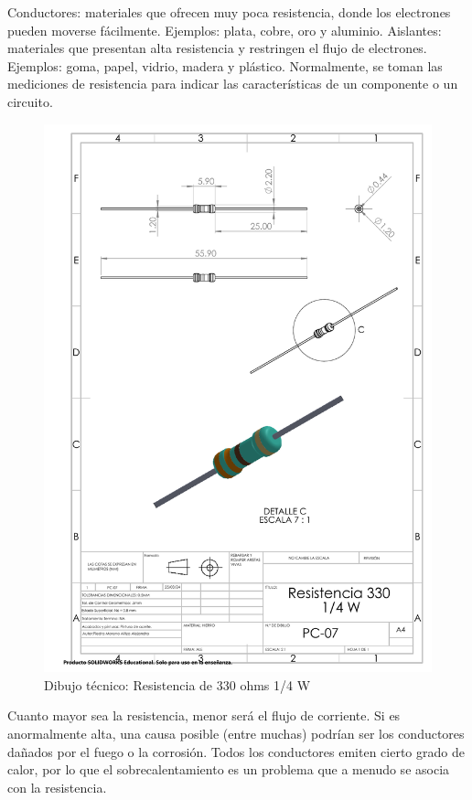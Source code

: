     Conductores: materiales que ofrecen muy poca resistencia, donde los electrones pueden moverse fácilmente. Ejemplos: plata, cobre, oro y aluminio.
    Aislantes: materiales que presentan alta resistencia y restringen el flujo de electrones. Ejemplos: goma, papel, vidrio, madera y plástico.
    Normalmente, se toman las mediciones de resistencia para indicar las características de un componente o un circuito.
    \begin{figure}[H]
        \centering
        \includegraphics[trim = {22mm 210mm 20mm 20mm},clip,scale=0.4]{22/Img/resistenciaDibujo.PDF}
        \caption{Dibujo técnico: Resistencia de 330 ohms 1/4 W}
        \label{fig:resistencia}
    \end{figure}
    Cuanto mayor sea la resistencia, menor será el flujo de corriente. Si es anormalmente alta, una causa posible (entre muchas) podrían ser los conductores dañados por el fuego o la corrosión. Todos los conductores emiten cierto grado de calor, por lo que el sobrecalentamiento es un problema que a menudo se asocia con la resistencia.
    

